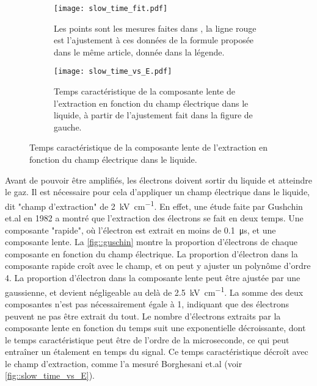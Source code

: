       \begin{figure}[htbp]
        \begin{subfigure}[t]{0.5\textwidth}
          \flushleft
          \captionsetup{width=.95\linewidth}
          \texttt{[image: slow\_time\_fit.pdf]}
          \caption{Les points sont les mesures faites dans \cite{Borghesani1990}, la ligne rouge est l'ajustement à ces données de la formule proposée dans le même article, donnée dans la légende.}
        \end{subfigure}
        \begin{subfigure}[t]{0.5\textwidth}
          \flushright        
          \captionsetup{width=.95\linewidth}
          \texttt{[image: slow\_time\_vs\_E.pdf]}
          \caption{Temps caractéristique de la composante lente de l'extraction en fonction du champ électrique dans le liquide, à partir de l'ajustement fait dans la figure de gauche.}
        \end{subfigure}
        \caption[Temps caractéristique de la composante lente de l'extraction en fonction du champ électrique.]{\label{fig::slow_time_vs_E}Temps caractéristique de la composante lente de l'extraction en fonction du champ électrique dans le liquide.}
      \end{figure}

      Avant de pouvoir être amplifiés, les électrons doivent sortir du liquide et atteindre le gaz. Il est nécessaire pour cela d'appliquer un champ électrique dans le liquide, dit "champ d'extraction" de \SI{2}{\kilo\volt\per\centi\meter}. En effet, une étude faite par Gushchin et.al en 1982\cite{guschin} a montré que l'extraction des électrons se fait en deux temps. Une composante "rapide", où l'électron est extrait en moins de \SI{0.1}{\micro\second}, et une composante lente.  La \autoref{fig::guschin} montre la proportion d'électrons de chaque composante en fonction du champ électrique. La proportion d'électron dans la composante rapide croît avec le champ, et on peut y ajuster un polynôme d'ordre 4. La proportion d'électron dans la composante lente peut être ajustée par une gaussienne, et devient négligeable au delà de \SI{2.5}{\kilo\volt\per\centi\meter}. La somme des deux composantes n'est pas nécessairement égale à 1, indiquant que des électrons peuvent ne pas être extrait du tout. Le nombre d'électrons extraits par la composante lente en fonction du temps suit une exponentielle décroissante, dont le temps caractéristique peut être de l'ordre de la microseconde\cite{Borghesani1990}, ce qui peut entraîner un étalement en temps du signal. Ce temps caractéristique décroît avec le champ d'extraction, comme l'a mesuré Borghesani et.al\cite{Borghesani1990} (voir \autoref{fig::slow_time_vs_E}). %

